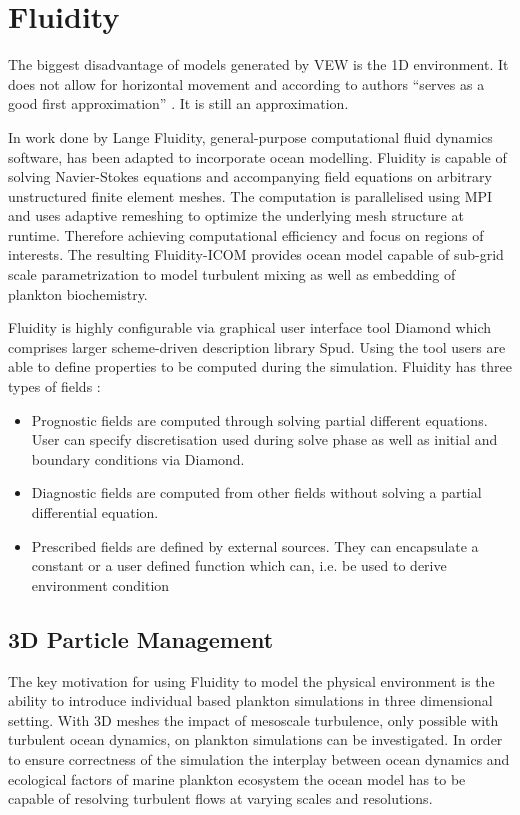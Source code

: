 \documentclass[12pt, a4paper]{report}
\begin{document}
\section{Fluidity}\label{sec:fluidity}
The biggest disadvantage of models generated by VEW is the 1D environment.
It does not allow for horizontal movement and according to authors
``serves as a good first approximation'' \cite{Woods2005}. It is still an approximation.

In work done by Lange \cite{FluidityVEW} Fluidity, general-purpose
computational fluid dynamics software, has been adapted to incorporate
ocean modelling. Fluidity \cite{Piggot2008,fluidity} is capable of
solving Navier-Stokes equations and accompanying field equations on
arbitrary unstructured finite element meshes. The computation is
parallelised using MPI and uses adaptive remeshing to optimize the
underlying mesh structure at runtime. Therefore achieving computational
efficiency and focus on regions of interests. The resulting Fluidity-ICOM
provides ocean model capable of sub-grid scale parametrization to model
turbulent mixing as well as embedding of plankton biochemistry.

Fluidity is highly configurable via graphical user interface tool Diamond
which comprises larger scheme-driven description library Spud\cite{ham2009spud}.
Using the tool users are able to define properties to be computed during the simulation.
Fluidity has three types of fields \cite{fluidity}:

\begin{itemize}
  \item Prognostic fields are computed through solving partial different equations.
    User can specify discretisation used during solve phase as well as initial and boundary
    conditions via Diamond.
  \item Diagnostic fields are computed from other fields without solving a
    partial differential equation.
  \item Prescribed fields are defined by external sources. They can encapsulate a constant
    or a user defined function which can, i.e. be used to derive environment condition
\end{itemize}

\subsection{3D Particle Management}\label{subsec:3d-pm}
The key motivation for using Fluidity to model the physical environment
is the ability to introduce individual based plankton simulations in three
dimensional setting. With 3D meshes the impact of mesoscale turbulence,
only possible with turbulent ocean dynamics, on plankton simulations
can be investigated. In order to ensure correctness of the simulation
the interplay between ocean dynamics and ecological factors of marine
plankton ecosystem the ocean model has to be capable of resolving
turbulent flows at varying scales and resolutions.
\end{document}

